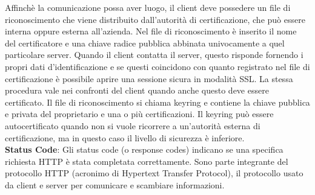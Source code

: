 Affinchè la comunicazione possa aver luogo, il client deve possedere un file di riconoscimento che viene distribuito dall'autorità di certificazione, 
che può essere interna oppure esterna all'azienda. Nel file di riconoscimento è inserito il nome del certificatore e una chiave radice pubblica abbinata 
univocamente a quel particolare server. Quando il client contatta il server, questo risponde fornendo i propri dati d'identificazione e se questi 
coincidono con quanto registrato nel file di certificazione è possibile aprire una sessione sicura in modalità SSL. La stessa procedura vale nei 
confronti del client quando anche questo deve essere certificato. Il file di riconoscimento si chiama keyring e contiene la chiave pubblica e privata 
del proprietario e una o più certificazioni. Il keyring può essere autocertificato quando non si vuole ricorrere a un'autorità esterna di certificazione, 
ma in questo caso il livello di sicurezza è inferiore.\\
\textbf{Status Code}: Gli status code (o response codes) indicano se una specifica richiesta HTTP è stata completata correttamente. Sono parte integrante del protocollo HTTP (acronimo di Hypertext Transfer Protocol), il protocollo usato da client e server per comunicare e scambiare informazioni.\\
